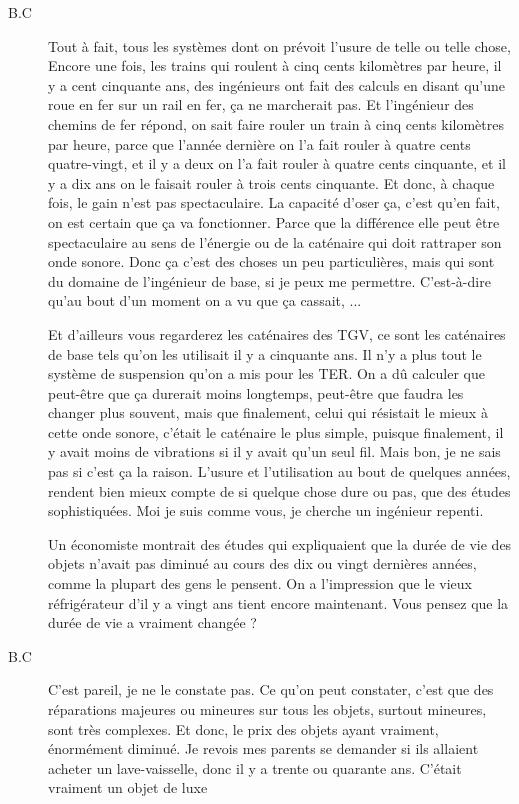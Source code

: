 \begin{description}
\item[B.C]Tout à fait, tous les systèmes dont on prévoit l'usure de telle ou telle chose, 
Encore une fois, les trains qui roulent à cinq cents kilomètres par heure, il y a cent cinquante ans, des ingénieurs ont fait des calculs en disant qu’une roue en fer sur un rail en fer, ça ne marcherait pas. Et l'ingénieur des chemins de fer répond, on sait faire rouler un train à cinq cents kilomètres par heure, parce que l'année dernière on l'a fait rouler à quatre cents quatre-vingt, et il y a deux on l'a fait rouler à quatre cents cinquante, et il y a dix ans on le faisait rouler à trois cents cinquante. Et donc, à chaque fois, le gain n'est pas spectaculaire. La capacité d'oser ça, c'est qu'en fait, on est certain que ça va fonctionner. Parce que la différence elle peut être spectaculaire au sens de l'énergie ou de la caténaire qui doit rattraper son onde sonore. Donc ça c'est des choses un peu particulières, mais qui sont du domaine de l'ingénieur de base, si je peux me permettre. C'est-à-dire qu'au bout d'un moment on a vu que ça cassait, ... 

Et d'ailleurs vous regarderez les caténaires des TGV, ce sont les caténaires de base tels qu'on les utilisait il y a cinquante ans. Il n'y a plus tout le système de suspension qu'on a mis pour les TER. On a dû calculer que peut-être que ça durerait moins longtemps, peut-être que faudra les changer plus souvent, mais que finalement, celui qui résistait le mieux à cette onde sonore, c'était le caténaire le plus simple, puisque finalement, il y avait moins de vibrations si il y avait qu'un seul fil. Mais bon, je ne sais pas si c'est ça la raison. L'usure et l'utilisation au bout de quelques années, rendent bien mieux compte de si quelque chose dure ou pas, que des études sophistiquées.
Moi je suis comme vous, je cherche un ingénieur repenti. 

\vspace{1\baselineskip}

Un économiste montrait des études qui expliquaient que la durée de vie des objets n'avait pas diminué au cours des dix ou vingt dernières années, comme la plupart des gens le pensent. On a l'impression que le vieux réfrigérateur d'il y a vingt ans tient encore maintenant. 
Vous pensez que la durée de vie a vraiment changée ?

\vspace{1\baselineskip}

\item[B.C]C'est pareil, je ne le constate pas. Ce qu'on peut constater, c'est que des réparations majeures ou mineures sur tous les objets, surtout mineures, sont très complexes. Et donc, le prix des objets ayant vraiment, énormément diminué. Je revois mes parents se demander si ils allaient acheter un lave-vaisselle, donc il y a trente ou quarante ans. C'était vraiment un objet de luxe


\end{description}
